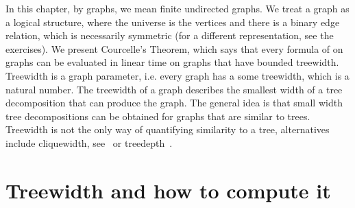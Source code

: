\label{sec:treewidth}
In this chapter, by graphs, we mean  finite undirected graphs. We treat a graph as a logical structure, where the universe is the vertices and there is a binary edge relation, which is necessarily symmetric (for a different representation, see the exercises). 
We  present  Courcelle's Theorem, which says that every formula of \mso on graphs can be evaluated in linear time on  graphs that have bounded treewidth.  
  Treewidth is a graph parameter, i.e. every  graph has a some treewidth, which is a natural number. The treewidth of a graph describes the smallest width of a tree decomposition that can produce the graph. The general idea is that small width tree decompositions can be obtained for graphs that are similar to trees. Treewidth is not the only way of quantifying similarity to a tree, alternatives include cliquewidth, see~\cite[Section 2.5]{Engelfriet:2012wq} or treedepth~\cite[Chapter 6]{Nesetril:2012bv}.


\section{Treewidth and how to compute it}

